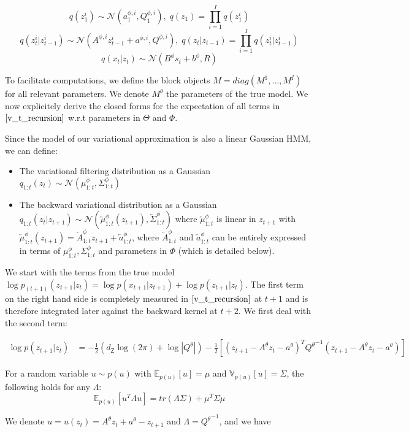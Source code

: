 \documentclass{article}
\newcommand{\1}{\mathbbm{1}}
\newcommand{\eqsp}{\;}
\newcommand{\expect}[2]{\mathbb{E}_{#1}\left[#2\right]}
\newcommand{\gaussian}[2]{\mathcal{N}\left( #1, #2 \right)}
\newcommand{\backward}[1]{\overleftarrow{#1}}
\newcommand{\vbackward}[1]{q_{1:#1}(z_{#1}|z_{#1 + 1})}
\newcommand{\vfilt}[1]{q_{1:#1}(z_{#1})}
\newcommand{\vbackwardparam}[2]{\backward{#1}_{1:#2}^\phi}
\newcommand{\vbackwardmean}[1]{\vbackwardparam{\mu}{#1}}
\newcommand{\vbackwardcov}[1]{\vbackwardparam{\Sigma}{#1}}
\newcommand{\inv}[1]{{#1}^{-1}}
\newcommand{\stateprec}{\inv{Q^\theta}}
\newcommand{\quadform}[2]{#1^T #2 #1}
\begin{document}
$$q(z_1^i) \sim \gaussian{a_1^{\phi,i}}{Q_1^{\phi,i}}, \eqsp q(z_1) = \prod_{i=1}^I q(z_1^i)$$
$$q(z_t^i|z_{t-1}^i) \sim \gaussian{A^{\phi,i} z_{t-1}^i + a^{\phi,i}}{Q^{\phi,i}}, \eqsp q(z_t|z_{t-1}) = \prod_{i=1}^I q(z_t^i|z_{t-1}^i)$$
$$q(x_t|z_t) \sim \gaussian{B^\phi s_t + b^\phi}{R}$$

To facilitate computations, we define the block objects $M = diag(M^1, \ldots, M^I)$ for all relevant parameters. We denote $M^\theta$ the parameters of the true model. We now explicitely derive the closed forms for the expectation of all terms in $\ref{v_t_recursion}$ w.r.t parameters in $\Theta$ and $\Phi$. 

Since the model of our variational approximation is also a linear Gaussian HMM, we can define: 

\begin{itemize}
    \item The variational filtering distribution as a Gaussian $\vfilt{t} \sim \gaussian{\mu_{1:t}^\phi}{\Sigma_{1:t}^\phi}$
    \item The backward variational distribution as a Gaussian $\vbackward{t} \sim \gaussian{\vbackwardmean{t}(z_{t+1})}{\vbackwardcov{t}}$ where $\vbackwardmean{t}$ is linear in $z_{t+1}$ with $\vbackwardmean{t}(z_{t+1}) = \backward{A}_{1:t}^\phi z_{t+1} + \backward{a}_{1:t}^\phi$, where $\backward{A}_{1:t}^\phi$ and $\backward{a}_{1:t}^\phi$ can be entirely expressed in terms of $\mu_{1:t}^\phi, \Sigma_{1:t}^\phi$ and parameters in $\Phi$ (which is detailed below).
\end{itemize} 

We start with the terms from the true model $\log p_{(t+1)}(z_{t+1}|z_t) = \log p(x_{t+1}|z_{t+1}) + \log p(z_{t+1}|z_t)$. The first term on the right hand side is completely measured in $\ref{v_t_recursion}$ at $t+1$ and is therefore integrated later against the backward kernel at $t+2$. We first deal with the second term:

\begin{align}
    \log p(z_{t+1}|z_t) &= -\frac{1}{2}\left(d_\mathsf{Z} \log(2\pi) + \log |Q^\theta|\right) - \frac{1}{2}\left[\quadform{(z_{t+1} - A^\theta z_t - a^\theta)}{\stateprec}\right]
\end{align}

For a random variable $u \sim p(u)$ with $\expect{p(u)}{u} = \mu$ and $\mathbb{V}_{p(u)}[u] = \Sigma$, the following holds for any $\Lambda$:
$$\expect{p(u)}{u^T \Lambda u} = tr(\Lambda \Sigma) + \mu^T \Sigma \mu$$

We denote $u = u(z_t) = A^\theta z_t + a^\theta - z_{t+1}$ and $\Lambda = \stateprec$, and we have
\end{document}
